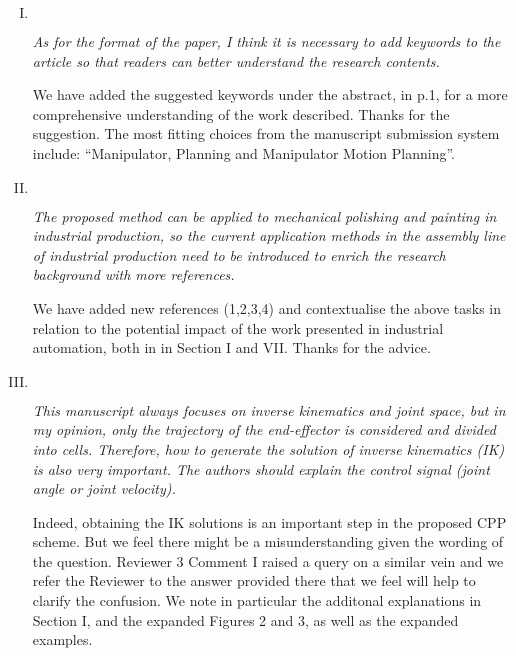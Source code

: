 \documentclass[11pt]{article}
\newenvironment{reviewer}
{\begin{mdframed}[roundcorner = 10pt,fontcolor=blue!70!black]\itshape}
{\end{mdframed}}
\begin{document}
\begin{enumerate}[I.]

 \item $ $
  \begin{reviewer}
     As for the format of the paper, I think it is necessary to add keywords to the article so that readers can better understand the research contents.
  \end{reviewer}
  \noindent We have added the suggested keywords under the abstract, in p.1, for a more comprehensive understanding of the work described. Thanks for the suggestion. The most fitting choices from the manuscript submission system include: ``Manipulator, Planning and Manipulator Motion Planning''. 
  
  \item $ $
  \begin{reviewer}
   The proposed method can be applied to mechanical polishing and painting in industrial production, so the current application methods in the assembly line of industrial production need to be introduced to enrich the research background with more references.
  \end{reviewer}
  \noindent We have added new references (1,2,3,4) and contextualise the above tasks in relation to the potential impact of the work presented in industrial automation, both in in Section I and VII. %
  Thanks for the advice.
  
  \item $ $
  \begin{reviewer}
    This manuscript always focuses on inverse kinematics and joint space, but in my opinion, only the trajectory of the end-effector is considered and divided into cells. Therefore, how to generate the solution of inverse kinematics (IK) is also very important. The authors should explain the control signal (joint angle or joint
velocity).
  \end{reviewer}
  \noindent Indeed, obtaining the IK solutions is an important step in the proposed CPP scheme. But we feel there might be a misunderstanding given the wording of the question. Reviewer 3 Comment I raised a query on a similar vein and we refer the Reviewer to the answer provided there that we feel will help to clarify the confusion. We note in particular the additonal explanations in Section I, and the expanded Figures 2 and 3, as well as the expanded examples. 


\end{enumerate}
\end{document}
